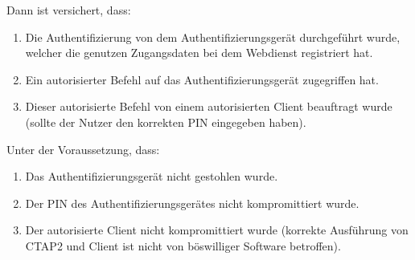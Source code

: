 Dann ist versichert, dass:

\begin{enumerate}
    \item Die Authentifizierung von dem Authentifizierungsgerät durchgeführt wurde, welcher die genutzen Zugangsdaten bei dem Webdienst registriert hat.
    \item Ein autorisierter Befehl auf das Authentifizierungsgerät zugegriffen hat.
    \item Dieser autorisierte Befehl von einem autorisierten Client beauftragt wurde (sollte der Nutzer den korrekten PIN eingegeben haben).
\end{enumerate}

Unter der Voraussetzung, dass:

\begin{enumerate}
    \item Das Authentifizierungsgerät nicht gestohlen wurde.
    \item Der PIN des Authentifizierungsgerätes nicht kompromittiert wurde.
    \item Der autorisierte Client nicht kompromittiert wurde (korrekte Ausführung von \ac{CTAP2} und Client ist nicht von böswilliger Software betroffen).
\end{enumerate}

